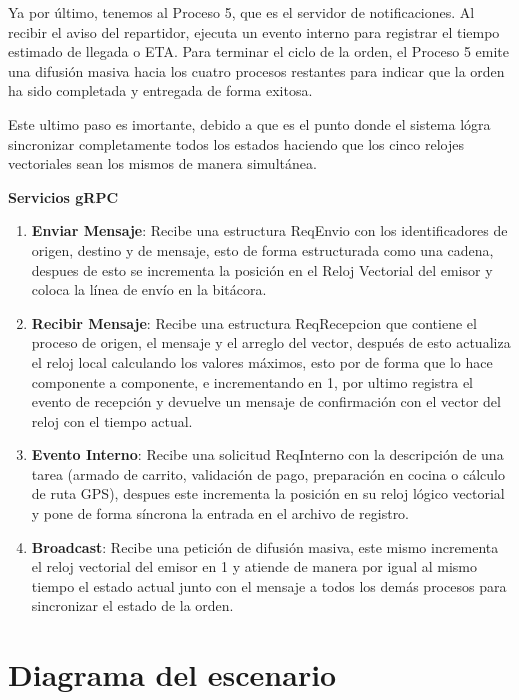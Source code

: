 \documentclass[letterpaper,11pt]{article}
\begin{document}
Ya por último, tenemos al Proceso 5, que es el servidor de notificaciones. Al recibir el aviso del repartidor, ejecuta un evento interno para registrar el tiempo estimado de llegada o ETA. Para terminar el ciclo de la orden, el Proceso 5 emite una difusión masiva hacia los cuatro procesos restantes para indicar que la orden ha sido completada y entregada de forma exitosa.

Este ultimo paso es imortante, debido a que es el punto donde el sistema lógra sincronizar completamente todos los estados haciendo que los cinco relojes vectoriales sean los mismos de manera simultánea.


\newpage
\textbf{Servicios gRPC}

\begin{enumerate}
    \item \textbf{Enviar Mensaje}: Recibe una estructura ReqEnvio con los identificadores de origen, 
    destino y de mensaje, esto de forma estructurada como una cadena, despues de esto se incrementa 
    la posición en el Reloj Vectorial del emisor y coloca la línea de envío en la bitácora.
    \item \textbf{Recibir Mensaje}: Recibe una estructura ReqRecepcion que contiene el proceso de origen, el mensaje
    y el arreglo del vector, después de esto actualiza el reloj local calculando los valores 
    máximos, esto por de forma que lo hace componente a componente, e incrementando en 1, por ultimo registra 
    el evento de recepción y devuelve un mensaje de confirmación con el vector del reloj con el tiempo actual.
    \item \textbf{Evento Interno}: Recibe una solicitud ReqInterno con la descripción de una tarea (armado de carrito, 
    validación de pago, preparación en cocina o cálculo de ruta GPS), despues este incrementa la posición 
    en su reloj lógico vectorial y pone de forma síncrona la entrada en el archivo de registro.
    \item \textbf{Broadcast}: Recibe una petición de difusión masiva, este mismo incrementa el reloj vectorial 
    del emisor en 1 y atiende de manera por igual al mismo tiempo el estado actual 
                    junto con el mensaje a todos los demás procesos para sincronizar el estado de la orden.
\end{enumerate}

\section{Diagrama del escenario}
\end{document}
